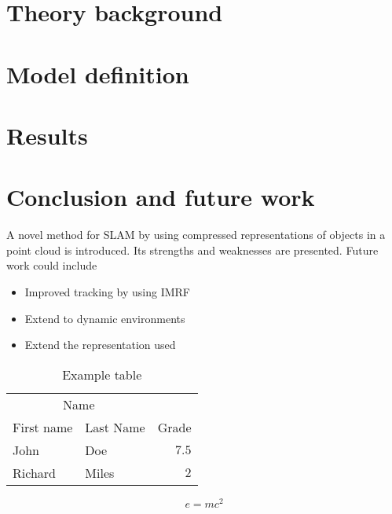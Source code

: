 \documentclass[twoside]{article}
\begin{document}
\begin{multicols}{2}

\section{Theory background}
\label{sec:theory}

\section{Model definition}
\label{sec:model}

\section{Results}
\label{sec:results}

\section{Conclusion and future work}
\label{sec:discussion}

A novel method for SLAM by using compressed representations of objects in a point cloud is introduced. Its strengths and weaknesses are presented. Future work could include
\begin{itemize}
    \item Improved tracking by using IMRF
    \item Extend to dynamic environments
    \item Extend the representation used
\end{itemize}
\begin{table}[H]
\caption{Example table}
\centering
\begin{tabular}{llr}
\toprule
\multicolumn{2}{c}{Name} \\
\cmidrule(r){1-2}
First name & Last Name & Grade \\
\midrule
John & Doe & $7.5$ \\
Richard & Miles & $2$ \\
\bottomrule
\end{tabular}
\end{table}

\lipsum[5] %

\begin{equation}
\label{eq:emc}
e = mc^2
\end{equation}

\lipsum[6] %



\end{multicols}
\end{document}
